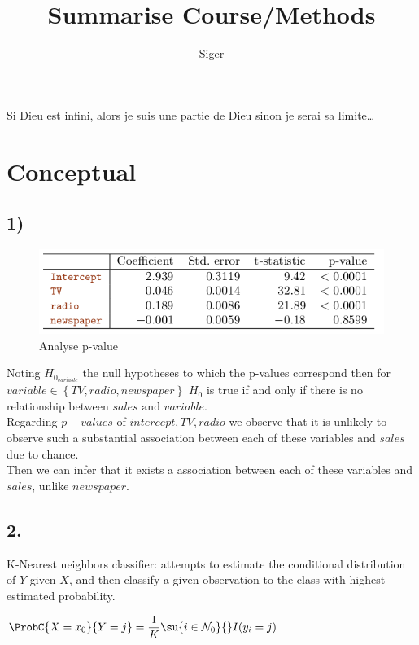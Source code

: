\documentclass[a4paper, 10pt]{scrartcl}\usepackage[]{graphicx}\usepackage[]{color}
\title{Summarise Course/Methods}
\author{Siger}
\begin{document}
\maketitle

Si Dieu est infini, alors je suis une partie de Dieu sinon je serai sa limite\ldots

\tableofcontents

\section{Conceptual}
\subsection{1)}
\begin{figure}[H]
	\begin{center}
		\includegraphics[width=\textwidth]{./images/table3_4.png}
	\end{center}
	\caption{Analyse p-value}
	\label{fig:1}
\end{figure}
Noting $H_{0_{variable}}$ the null hypotheses to which the p-values 
correspond then for $variable\in\left\{ TV,radio,newspaper \right\}$
$H_{0}$ is true if and only if there is no relationship between $sales\text{ and }variable$.\\
Regarding $p-values$ of $intercept, TV, radio$ we observe that it is
unlikely to observe such a 
substantial association between each of these variables and $sales$ due to chance.\\
Then we can infer that it exists a association between each of these 
variables and $sales$, unlike $newspaper$.
\subsection{2.}
K-Nearest neighbors classifier: attempts to estimate the conditional
distribution of $Y$ given $X$, and then classify a
given observation to the class with highest estimated probability.
\begin{center}
	$\ProbC{X=x_{0}}{Y=j}=\dfrac{1}{K}\su{ {i\in\mathcal{N}_{0}}}{}I(y_{i}=j)$
\end{center}
\end{document}
